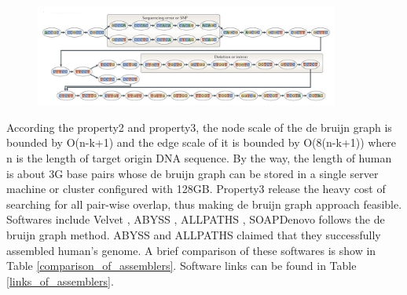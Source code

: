 \documentclass{article}
\begin{document}
\begin{figure}[ht]
  \centering
  \includegraphics[width=10cm]{Figure6.jpg}\\
  \caption{}\label{debruijn_graph_example}
\end{figure}
According the property2 and property3, the node scale of the de bruijn graph is bounded by O(n-k+1) and the edge scale of it is bounded by O(8(n-k+1)) where n is the length of target origin DNA sequence. By the way, the length of human is about 3G base pairs whose de bruijn graph can be stored in a single server machine or cluster configured with 128GB. Property3 release the heavy cost of searching for all pair-wise overlap, thus making de bruijn graph approach feasible. Softwares include Velvet \cite{zerbino2008velvet}, ABYSS \cite{simpson2009abyss}, ALLPATHS \cite{butler2008allpaths}, SOAPDenovo \cite{li2010novo} follows the de bruijn graph method. ABYSS and ALLPATHS claimed that they successfully assembled human's genome. A brief comparison of these softwares is show in Table \ref{comparison_of_assemblers}. Software links can be found in Table \ref{links_of_assemblers}.\\
\end{document}
